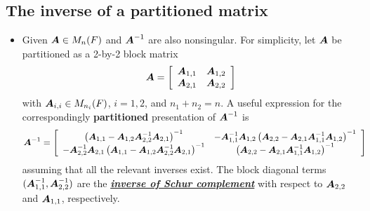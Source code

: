 \documentclass[11pt]{article}
\begin{document}
\subsection{The inverse of a partitioned matrix}
\begin{itemize}
\item Given $\boldsymbol{A} \in M_{n}(F)$ and $\boldsymbol{A}^{-1}$ are also nonsingular. For simplicity, let $\boldsymbol{A}$ be partitioned as a 2-by-2 block matrix
\begin{align*}
\boldsymbol{A} = \left[ \begin{array}{cc}
\boldsymbol{A}_{1,1} & \boldsymbol{A}_{1,2}\\
\boldsymbol{A}_{2,1} & \boldsymbol{A}_{2,2}
\end{array} \right]
\end{align*} with $\boldsymbol{A}_{i,i} \in M_{n_i}(F)$, $i = 1, 2$, and $n_1 + n_2 = n$.  A useful expression for the correspondingly \textbf{partitioned} presentation of $\boldsymbol{A}^{-1}$ is
\begin{align}
\boldsymbol{A}^{-1} &= \left[ \begin{array}{cc}
\left(\boldsymbol{A}_{1,1} -   \boldsymbol{A}_{1,2} \boldsymbol{A}_{2,2}^{-1}\boldsymbol{A}_{2,1}\right)^{-1}& -\boldsymbol{A}_{1,1}^{-1}\boldsymbol{A}_{1,2} \left(\boldsymbol{A}_{2,2} -   \boldsymbol{A}_{2,1} \boldsymbol{A}_{1,1}^{-1}\boldsymbol{A}_{1,2}\right)^{-1}\\
-\boldsymbol{A}_{2,2}^{-1}\boldsymbol{A}_{2,1}\left(\boldsymbol{A}_{1,1} -   \boldsymbol{A}_{1,2} \boldsymbol{A}_{2,2}^{-1}\boldsymbol{A}_{2,1}\right)^{-1} & \left(\boldsymbol{A}_{2,2} -   \boldsymbol{A}_{2,1} \boldsymbol{A}_{1,1}^{-1}\boldsymbol{A}_{1,2}\right)^{-1}
\end{array} \right]\label{eqn: block_matrix_inversion}
\end{align} assuming that all the relevant inverses exist. The block diagonal terms $(\boldsymbol{A}^{-1}_{1,1}, \boldsymbol{A}^{-1}_{2,2})$ are the \underline{\textbf{\emph{inverse of Schur complement}}} with respect to $\boldsymbol{A}_{2,2}$ and $\boldsymbol{A}_{1,1}$, respectively.


\end{itemize}
\end{document}
